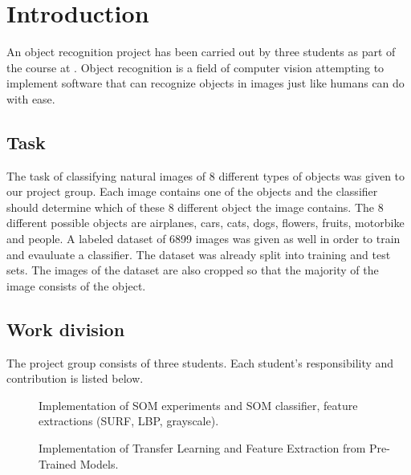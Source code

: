 \documentclass[doc/report.tex]{subfiles}
\begin{document}
\section{Introduction}
An object recognition project has been carried out by three students as part of
the course \courseName{} at \courseUniversity. Object recognition is a field of
computer vision attempting to implement software that can recognize objects in
images just like humans can do with ease.

\subsection{Task}
The task of classifying natural images of 8 different types of objects was
given to our project group. Each image contains one of the objects and the
classifier should determine which of these 8 different object the image
contains. The 8 different possible objects are airplanes, cars, cats, dogs,
flowers, fruits, motorbike and people. A labeled dataset of 6899 images was
given as well in order to train and evauluate a classifier. The dataset was
already split into training and test sets. The images of the dataset are also
cropped so that the majority of the image consists of the object.

\subsection{Work division}
The project group consists of three students. Each student's responsibility and
contribution is listed below.

\begin{description}
    \item[\authorA] Implementation of SOM experiments and SOM classifier,
        feature extractions (SURF, LBP, grayscale).
    \item[\authorB] Implementation of Transfer Learning and Feature Extraction
        from Pre-Trained Models.
    \item[\authorC] %
\end{description}
    
\end{document}
